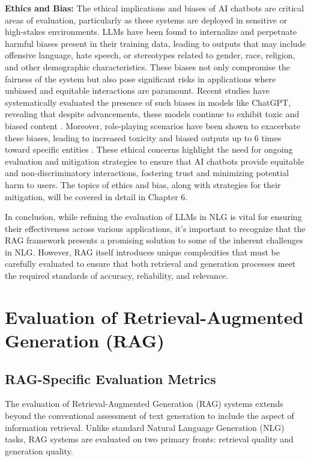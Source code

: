 \textbf{Ethics and Bias:} The ethical implications and biases of AI chatbots are critical areas of evaluation, particularly as these systems are deployed in sensitive or high-stakes environments. LLMs have been found to internalize and perpetuate harmful biases present in their training data, leading to outputs that may include offensive language, hate speech, or stereotypes related to gender, race, religion, and other demographic characteristics. These biases not only compromise the fairness of the system but also pose significant risks in applications where unbiased and equitable interactions are paramount. Recent studies have systematically evaluated the presence of such biases in models like ChatGPT, revealing that despite advancements, these models continue to exhibit toxic and biased content \cite{zhuo2023red}. Moreover, role-playing scenarios have been shown to exacerbate these biases, leading to increased toxicity and biased outputs up to 6 times toward specific entities \cite{deshpande2023toxicity}. These ethical concerns highlight the need for ongoing evaluation and mitigation strategies to ensure that AI chatbots provide equitable and non-discriminatory interactions, fostering trust and minimizing potential harm to users. The topics of ethics and bias, along with strategies for their mitigation, will be covered in detail in Chapter 6.

In conclusion, while refining the evaluation of LLMs in NLG is vital for ensuring their effectiveness across various applications, it’s important to recognize that the RAG framework presents a promising solution to some of the inherent challenges in NLG. However, RAG itself introduces unique complexities that must be carefully evaluated to ensure that both retrieval and generation processes meet the required standards of accuracy, reliability, and relevance.

\section{Evaluation of Retrieval-Augmented Generation (RAG)}

\subsection{RAG-Specific Evaluation Metrics}

The evaluation of Retrieval-Augmented Generation (RAG) systems extends beyond the conventional assessment of text generation to include the aspect of information retrieval. Unlike standard Natural Language Generation (NLG) tasks, RAG systems are evaluated on two primary fronts: retrieval quality and generation quality. 

